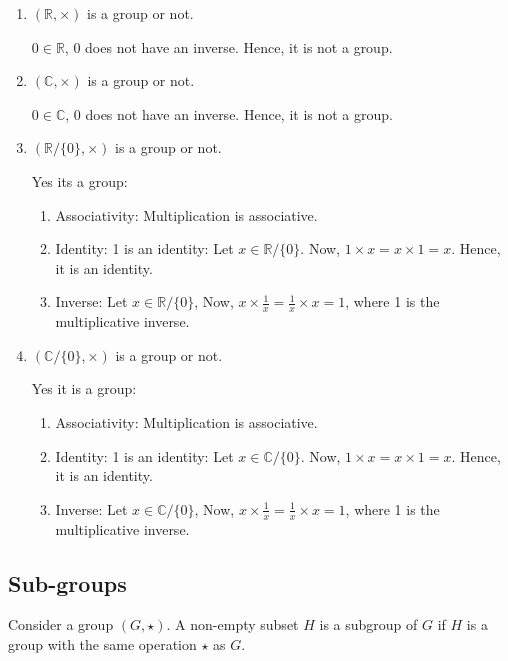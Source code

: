 \documentclass[12pt, oneside]{book}
\begin{document}
\begin{enumerate}
    \item \( \left(\mathbb{R}, \times \right)\) is a group or not.
    
    \(0 \in \mathbb{R}\), \(0\) does not have an inverse. Hence, it is not a group.

    \item \(\left(\mathbb{C}, \times\right)\) is a group or not.
    
    \(0 \in \mathbb{C}\), \(0\) does not have an inverse. Hence, it is not a group.
    
    \item \(\left(\mathbb{R}/\{0\}, \times \right)\) is a group or not.
    
    Yes its a group:
    \begin{enumerate}
        \item Associativity: Multiplication is associative.
        \item Identity: 1 is an identity:
        Let \(x \in \mathbb{R}/\{0\} \). Now, \(1 \times x = x \times 1 = x\). Hence, it is an identity.
        \item Inverse: Let \(x \in \mathbb{R}/\{0\} \), Now, \(x \times \frac{1}{x} = \frac{1}{x} \times x = 1\), where 1 is the multiplicative inverse.
    \end{enumerate}

    \item \(\left(\mathbb{C}/\{0\}, \times \right)\) is a group or not.
    
    Yes it is a group:
    \begin{enumerate}
        \item Associativity: Multiplication is associative.
        \item Identity: 1 is an identity:
        Let \(x \in \mathbb{C}/\{0\} \). Now, \(1 \times x = x \times 1 = x\). Hence, it is an identity.
        \item Inverse: Let \(x \in \mathbb{C}/\{0\} \), Now, \(x \times \frac{1}{x} = \frac{1}{x} \times x = 1\), where 1 is the multiplicative inverse.
    \end{enumerate}
\end{enumerate}
\subsection{Sub-groups}
Consider a group \( \left(G, \star \right) \).
A non-empty subset \(H\) is a subgroup of \(G\) if \(H\) is a group with the same operation \(\star\) as \(G\).
\end{document}
